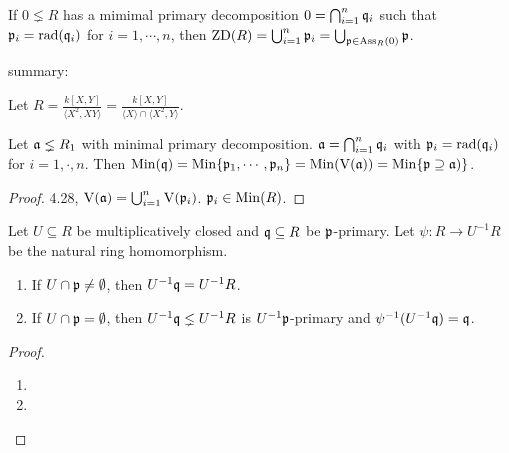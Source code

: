 \begin{corollary}
    If $0 \lneq R$ has a mimimal primary decomposition $0 = \bigcap_{i=1}^{n} \mathfrak{q}_i$ such that $\mathfrak{p}_i = \operatorname{rad}(\mathfrak{q}_i)$ for $i = 1,\cdots,n$, then $\operatorname{ZD}(R) = \bigcup_{i=1}^{n} \mathfrak{p}_i = \bigcup_{\mathfrak{p} \in \operatorname{Ass}_R(0)}\mathfrak{p}$.
\end{corollary}

summary:

\begin{example}
    Let $R = \frac{k[X,Y]}{\langle X^{2},XY \rangle} = \frac{k[X,Y]}{\langle X \rangle \cap \langle X^{2},Y \rangle}$.
\end{example}

\begin{proposition}
    Let $\mathfrak{a} \lneq R_1$ with minimal primary decomposition. $\mathfrak{a} = \bigcap_{i=1}^{n} \mathfrak{q}_i$ with $\mathfrak{p}_i = \operatorname{rad}(\mathfrak{q}_i)$ for $i = 1,\cdot,n$. Then $\operatorname{Min}(\mathfrak{q}) = \operatorname{Min}\{\mathfrak{p}_1,\cdots,\mathfrak{p}_n\} = \operatorname{Min}(\operatorname{V}(\mathfrak{a})) = \operatorname{Min}\{\mathfrak{p} \supseteq \mathfrak{a})\}$. 
\end{proposition}

\begin{proof}
    4.28, $\operatorname{V}(\mathfrak{a}) = \bigcup_{i=1}^{n} \operatorname{V}(\mathfrak{p}_i)$. $\mathfrak{p}_i \in \operatorname{Min}(R)$.
\end{proof}

\begin{lemma}
    Let $U \subseteq R$ be multiplicatively closed and $\mathfrak{q} \subseteq R$ be $\mathfrak{p}$-primary. Let $\psi: R \to U^{-1}R$ be the natural ring homomorphism.
    \begin{enumerate}
        \item If $U \cap \mathfrak{p} \neq \emptyset$, then $U^{-1}\mathfrak{q} = U^{-1}R$.
        \item If $U \cap \mathfrak{p} = \emptyset$, then $U^{-1}\mathfrak{q} \lneq U^{-1}R$ is $U^{-1}\mathfrak{p}$-primary and $\psi^{-1}(U^{-1}\mathfrak{q}) = \mathfrak{q}$.
    \end{enumerate}
\end{lemma}

\begin{proof}
    \begin{enumerate}
        \item 
        \item  \qedhere
    \end{enumerate}
\end{proof}

